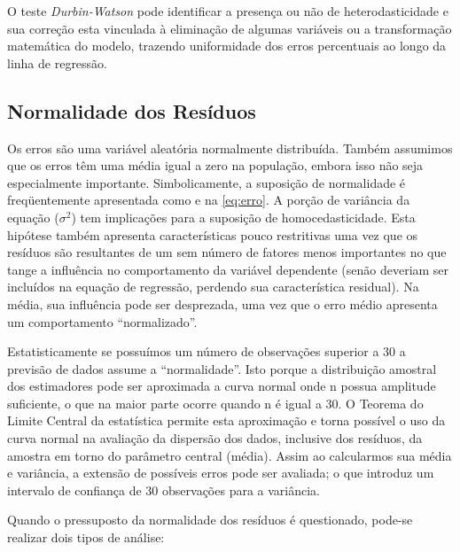 \noindent O  teste  \textit{Durbin-Watson}  pode  identificar a presença ou não de heterodasticidade  e sua  correção  esta vinculada  à  eliminação  de  algumas  variáveis  ou  a  transformação  matemática  do modelo,   trazendo   uniformidade   dos   erros   percentuais   ao   longo   da   linha   de regressão.
	
\subsection{Normalidade dos Resíduos}

\noindent Os erros são uma variável aleatória normalmente distribuída. Também assumimos que os erros têm uma média igual a zero na população, embora isso não seja especialmente importante. Simbolicamente, a suposição de normalidade é freqüentemente apresentada como e na \autoref{eq:erro}. A porção de variância da equação ($\sigma^2$) tem implicações para a suposição de homocedasticidade. Esta  hipótese  também  apresenta  características  pouco  restritivas  uma  vez que  os  resíduos  são  resultantes  de  um  sem  número  de  fatores  menos  importantes no  que  tange  a  influência  no  comportamento  da  variável  dependente  (senão deveriam  ser  incluídos  na  equação  de  regressão,  perdendo  sua  característica residual). Na média, sua influência pode ser desprezada, uma vez que o erro médio apresenta um comportamento “normalizado”.

Estatisticamente  se  possuímos  um  número  de  observações  superior  a  30  a previsão  de  dados assume a “normalidade”.  Isto porque  a  distribuição amostral dos estimadores    pode  ser  aproximada  a  curva  normal  onde n  possua  amplitude suficiente, o que na maior parte ocorre quando n é igual a 30. O Teorema do Limite Central  da  estatística  permite  esta  aproximação  e  torna  possível  o  uso  da  curva normal na avaliação da dispersão dos dados, inclusive dos resíduos, da amostra em torno  do  parâmetro  central  (média).  Assim  ao  calcularmos  sua  média  e  variância,  a extensão  de  possíveis  erros  pode  ser  avaliada;  o  que  introduz  um  intervalo  de confiança de 30 observações para a variância.

Quando  o  pressuposto  da  normalidade  dos  resíduos  é  questionado, pode-se realizar dois tipos de análise:

